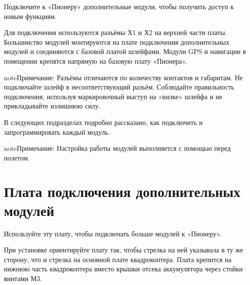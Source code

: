 \documentclass[a4paper,10pt,russian]{sphinxmanual}
\begin{document}
Подключите к «Пионеру» дополнительные модули, чтобы получить доступ к новым функциям.


Для подключения используются разъёмы Х1 и Х2 на верхней части платы. Большинство модулей монтируются на плате подключения дополнительных модулей и соединяются с базовой платой шлейфами. Модули GPS и навигации в помещении крепятся напрямую на базовую плату «Пионера».

\begin{sphinxadmonition}{note}{Примечание:}
Разъёмы отличаются по количеству контактов и габаритам. Не подключайте  шлейф в несоответствующий разъём. Соблюдайте правильность подключения, используя маркировочный выступ на «вилке» шлейфа и не прикладывайте излишнюю силу.
\end{sphinxadmonition}

В следующих подразделах подробно рассказано, как подключить и запрограммировать каждый модуль.

\begin{sphinxadmonition}{note}{Примечание:}
Настройка работы модулей выполняется с помощью   перед полетом.
\end{sphinxadmonition}



\section{Плата подключения дополнительных модулей}
\label{\detokenize{module/board:id1}}\label{\detokenize{module/board::doc}}
Используйте эту плату, чтобы подключать больше модулей к «Пионеру».


При установке ориентируйте плату так, чтобы стрелка на ней указывала в ту же сторону, что и стрелка на основной плате квадрокоптера.
Плата крепится на нижнюю часть квадрокоптера вместо крышки отсека аккумулятора через стойки винтами М3.
\end{document}
